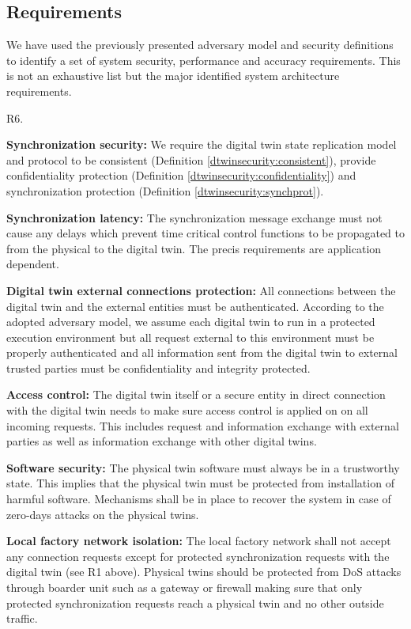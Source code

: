 \subsection{Requirements}
\label{dtwinsecurity:requirements}
We have used the previously presented adversary model and security definitions to identify a set of system security, performance and accuracy requirements. This is not an exhaustive list but the major identified system architecture requirements.
\begin{labeling}{R6.}
\item [R1.] \textbf{Synchronization security:} We require the digital twin state replication model and protocol to be consistent (Definition \ref{dtwinsecurity:consistent}), provide confidentiality protection (Definition \ref{dtwinsecurity:confidentiality}) and synchronization protection (Definition \ref{dtwinsecurity:synchprot}).
\item[R2.] \textbf{Synchronization latency:} The synchronization message exchange must not cause any delays which prevent time critical control functions to be propagated to from the physical to the digital twin. The precis requirements are application dependent.
\item[R3.] \textbf{Digital twin external connections protection:} All connections between the digital twin and the external entities must be authenticated. According to the adopted adversary model, we assume each digital twin to run in a protected execution environment but all request external to this environment must be properly authenticated and all information sent from the digital twin to external trusted parties must be confidentiality and integrity protected. 
\item[R4.] \textbf{Access control:} The digital twin itself or a secure entity in direct connection with the digital twin needs to make sure access control is applied on on all incoming requests.  This includes request and information exchange with external parties as well as information exchange with other digital twins. 
\item[R5.] \textbf{Software security:} The physical twin software must always be in a trustworthy state. This implies that the physical twin must be protected from installation of harmful software. Mechanisms shall be in place to recover the system in case of zero-days attacks on the physical twins.
\item[R6.]\textbf{Local factory network isolation:} The local factory network shall not accept any connection requests except for protected synchronization requests with the digital twin (see R1 above).  Physical twins should be protected from DoS attacks through boarder unit such as a gateway or firewall making sure that only protected synchronization requests reach a physical twin and no other outside traffic.

\end{labeling}

